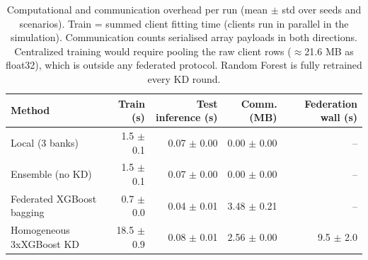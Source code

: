 \begin{table}[t]
\centering
\scriptsize
\caption{Computational and communication overhead per run (mean $\pm$ std over seeds and scenarios). Train = summed client fitting time (clients run in parallel in the simulation). Communication counts serialised array payloads in both directions. Centralized training would require pooling the raw client rows ($\approx$21.6 MB as float32), which is outside any federated protocol. Random Forest is fully retrained every KD round.}
\label{tab:cost}
\begin{tabular}{lrrrr}
\toprule
Method & Train (s) & Test inference (s) & Comm. (MB) & Federation wall (s) \\
\midrule
Local (3 banks) & 1.5 $\pm$ 0.1 & 0.07 $\pm$ 0.00 & 0.00 $\pm$ 0.00 & -- \\
Ensemble (no KD) & 1.5 $\pm$ 0.1 & 0.07 $\pm$ 0.00 & 0.00 $\pm$ 0.00 & -- \\
Federated XGBoost bagging & 0.7 $\pm$ 0.0 & 0.04 $\pm$ 0.01 & 3.48 $\pm$ 0.21 & -- \\
Homogeneous 3xXGBoost KD & 18.5 $\pm$ 0.9 & 0.08 $\pm$ 0.01 & 2.56 $\pm$ 0.00 & 9.5 $\pm$ 2.0 \\
\bottomrule
\end{tabular}
\end{table}

